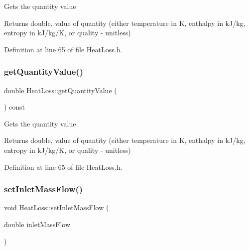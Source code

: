 Gets the quantity value \begin{DoxyReturn}{Returns}
double, value of quantity (either temperature in K, enthalpy in k\+J/kg, entropy in k\+J/kg/K, or quality -\/ unitless) 
\end{DoxyReturn}


Definition at line 65 of file Heat\+Loss.\+h.

\mbox{\label{class_heat_loss_a7f7fd85e4fc8bf96dcc213f3dd44ecf7}} 
\subsubsection{\texorpdfstring{get\+Quantity\+Value()}{getQuantityValue()}\hspace{0.1cm}{\footnotesize\ttfamily [3/3]}}
{\footnotesize\ttfamily double Heat\+Loss\+::get\+Quantity\+Value (\begin{DoxyParamCaption}{ }\end{DoxyParamCaption}) const\hspace{0.3cm}{\ttfamily [inline]}}

Gets the quantity value \begin{DoxyReturn}{Returns}
double, value of quantity (either temperature in K, enthalpy in k\+J/kg, entropy in k\+J/kg/K, or quality -\/ unitless) 
\end{DoxyReturn}


Definition at line 65 of file Heat\+Loss.\+h.

\mbox{\label{class_heat_loss_ac4154dc9922b6ddf3f2e7a10cc64c61f}} 
\subsubsection{\texorpdfstring{set\+Inlet\+Mass\+Flow()}{setInletMassFlow()}\hspace{0.1cm}{\footnotesize\ttfamily [1/3]}}
{\footnotesize\ttfamily void Heat\+Loss\+::set\+Inlet\+Mass\+Flow (\begin{DoxyParamCaption}\item[{double}]{inlet\+Mass\+Flow }\end{DoxyParamCaption})}

